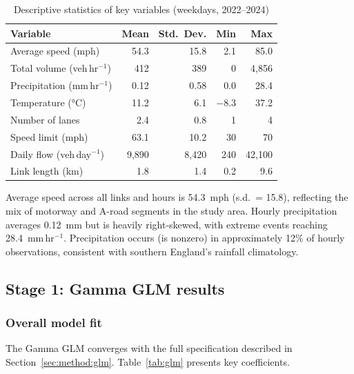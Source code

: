 \documentclass[review]{elsarticle}
\begin{document}
\begin{table}[htbp]
\centering
\caption{Descriptive statistics of key variables (weekdays, 2022--2024)}
\label{tab:desc}
\begin{tabular}{lrrrr}
\toprule
Variable & Mean & Std.\ Dev. & Min & Max \\
\midrule
Average speed (mph) & 54.3 & 15.8 & 2.1 & 85.0 \\
Total volume (veh\,hr$^{-1}$) & 412 & 389 & 0 & 4{,}856 \\
Precipitation (mm\,hr$^{-1}$) & 0.12 & 0.58 & 0.0 & 28.4 \\
Temperature (\si{\degreeCelsius}) & 11.2 & 6.1 & $-$8.3 & 37.2 \\
Number of lanes & 2.4 & 0.8 & 1 & 4 \\
Speed limit (mph) & 63.1 & 10.2 & 30 & 70 \\
Daily flow (veh\,day$^{-1}$) & 9{,}890 & 8{,}420 & 240 & 42{,}100 \\
Link length (km) & 1.8 & 1.4 & 0.2 & 9.6 \\
\bottomrule
\end{tabular}
\end{table}

Average speed across all links and hours is 54.3~mph (s.d.\ = 15.8), reflecting the mix of motorway and A-road segments in the study area. Hourly precipitation averages 0.12~mm but is heavily right-skewed, with extreme events reaching 28.4~mm\,hr$^{-1}$. Precipitation occurs (is nonzero) in approximately 12\% of hourly observations, consistent with southern England's rainfall climatology.


\subsection{Stage 1: Gamma GLM results}
\label{sec:results:glm}

\subsubsection{Overall model fit}

The Gamma GLM converges with the full specification described in Section~\ref{sec:method:glm}. Table~\ref{tab:glm} presents key coefficients.
\end{document}
